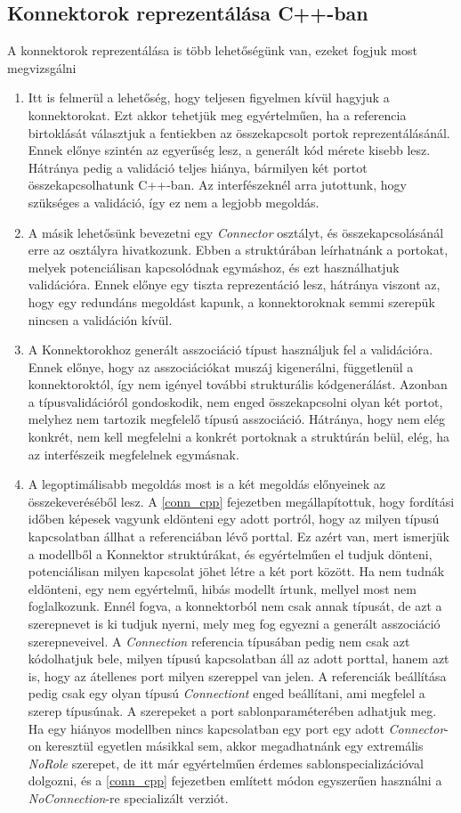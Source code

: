 \documentclass[a4paper,12pt]{report}
\begin{document}
\subsection{Konnektorok reprezentálása C++-ban}
A konnektorok reprezentálása is több lehetőségünk van, ezeket fogjuk most megvizsgálni
\begin{enumerate}
\item Itt is felmerül a lehetőség, hogy teljesen figyelmen kívül hagyjuk a konnektorokat. Ezt akkor tehetjük meg egyértelműen, ha a referencia birtoklását választjuk a fentiekben az összekapcsolt portok reprezentálásánál. Ennek előnye szintén az egyerűség lesz, a generált kód mérete kisebb lesz. Hátránya pedig a validáció teljes hiánya, bármilyen két portot összekapcsolhatunk C++-ban. Az interfészeknél arra jutottunk, hogy szükséges a validáció, így ez nem a legjobb megoldás.
\item A másik lehetősünk bevezetni egy \textit{Connector} osztályt, és összekapcsolásánál erre az osztályra hivatkozunk. Ebben a struktúrában leírhatnánk a portokat, melyek potenciálisan kapcsolódnak egymáshoz, és ezt használhatjuk validációra. Ennek előnye egy tiszta reprezentáció lesz, hátránya viszont az, hogy egy redundáns megoldást kapunk, a konnektoroknak semmi szerepük nincsen a validáción kívül.
\item A Konnektorokhoz generált asszociáció típust használjuk fel a validációra. Ennek előnye, hogy az asszociációkat muszáj kigenerálni, függetlenül a konnektoroktól, így nem igényel további strukturális kódgenerálást. Azonban a típusvalidációról gondoskodik, nem enged összekapcsolni olyan két portot, melyhez nem tartozik megfelelő típusú asszociáció. Hátránya, hogy nem elég konkrét, nem kell megfelelni a konkrét portoknak a struktúrán belül, elég, ha az interfészeik megfelelnek egymásnak.
\item A legoptimálisabb megoldás most is a két megoldás előnyeinek az összekeveréséből lesz. A \ref{conn_cpp} fejezetben megállapítottuk, hogy fordítási időben képesek vagyunk eldönteni egy adott portról, hogy az milyen típusú kapcsolatban állhat a referenciában lévő porttal. Ez azért van, mert ismerjük a modellből a Konnektor struktúrákat, és egyértelműen el tudjuk dönteni, potenciálisan milyen kapcsolat jöhet létre a két port között. Ha nem tudnák eldönteni, egy nem egyértelmű, hibás modellt írtunk, mellyel most nem foglalkozunk. Ennél fogva, a konnektorból nem csak annak típusát, de azt a szerepnevet is ki tudjuk nyerni, mely meg fog egyezni a generált asszociáció szerepneveivel. A \textit{Connection} referencia típusában pedig nem csak azt kódolhatjuk bele, milyen típusú kapcsolatban áll az adott porttal, hanem azt is, hogy az átellenes port milyen szereppel van jelen. A referenciák beállítása pedig csak egy olyan típusú \textit{Connectiont} enged beállítani, ami megfelel a szerep típusúnak. A szerepeket a port sablonparaméterében adhatjuk meg. Ha egy hiányos modellben nincs kapcsolatban egy port egy adott \textit{Connector}-on keresztül egyetlen másikkal sem, akkor megadhatnánk egy extremális \textit{NoRole} szerepet, de itt már egyértelműen érdemes sablonspecializációval dolgozni, és a \ref{conn_cpp} fejezetben említett módon egyszerűen használni a \textit{NoConnection}-re specializált verziót.  \\

\end{enumerate}
\end{document}
